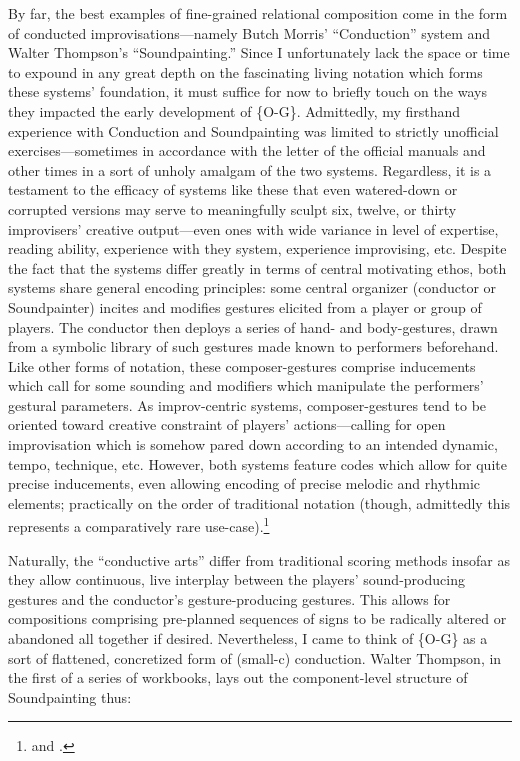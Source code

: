     By far, the best examples of fine-grained relational composition come in the form of conducted improvisations---namely Butch Morris' ``Conduction'' system and Walter Thompson's ``Soundpainting.'' Since I unfortunately lack the space or time to expound in any great depth on the fascinating living notation which forms these systems' foundation, it must suffice for now to briefly touch on the ways they impacted the early development of \{O-G\}. Admittedly, my firsthand experience with Conduction and Soundpainting was limited to strictly unofficial exercises---sometimes in accordance with the letter of the official manuals and other times in a sort of unholy amalgam of the two systems. Regardless, it is a testament to the efficacy of systems like these that even watered-down or corrupted versions may serve to meaningfully sculpt six, twelve, or thirty improvisers' creative output---even ones with wide variance in level of expertise, reading ability, experience with they system, experience improvising, etc. Despite the fact that the systems differ greatly in terms of central motivating ethos, both systems share general encoding principles: some central organizer (conductor or Soundpainter) incites and modifies gestures elicited from a player or group of players. The conductor then deploys a series of hand- and body-gestures, drawn from a symbolic library of such gestures made known to performers beforehand. Like other forms of notation, these composer-gestures comprise inducements which call for some sounding and modifiers which manipulate the performers' gestural parameters. As improv-centric systems, composer-gestures tend to be oriented toward creative constraint of players' actions---calling for open improvisation which is somehow pared down according to an intended dynamic, tempo, technique, etc. However, both systems feature codes which allow for quite precise inducements, even allowing encoding of precise melodic and rhythmic elements; practically on the order of traditional notation (though, admittedly this represents a comparatively rare use-case).\footnote{\autocite{Morris_2017} and \autocite{Thompson_2006_1}.}

    Naturally, the ``conductive arts'' differ from traditional scoring methods insofar as they allow continuous, live interplay between the players' sound-producing gestures and the conductor's gesture-producing gestures. This allows for compositions comprising pre-planned sequences of signs to be radically altered or abandoned all together if desired. Nevertheless, I came to think of \{O-G\} as a sort of flattened, concretized form of (small-c) conduction. Walter Thompson, in the first of a series of workbooks, lays out the component-level structure of Soundpainting thus:

